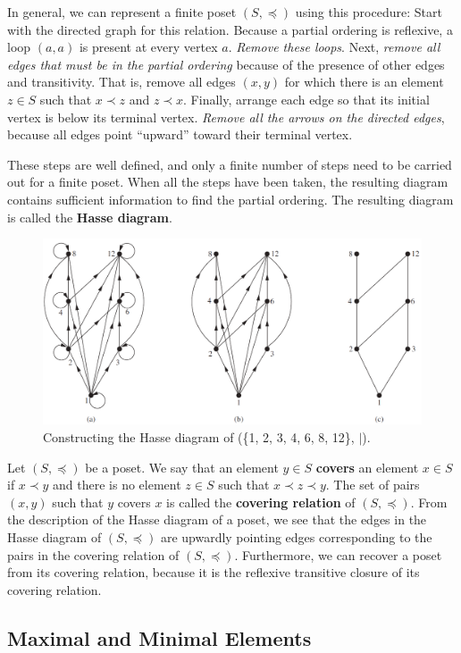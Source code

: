 \documentclass[11pt]{article}
\begin{document}
In general, we can represent a finite poset $(S, \preceq)$ using this procedure: Start with the directed graph for this relation. Because a partial ordering is reflexive, a loop $(a, a)$ is present at every vertex $a$. \textit{Remove these loops}. Next, \textit{remove all edges that must be in the partial ordering} because of the presence of other edges and transitivity. That is, remove all edges $(x, y)$ for which there is an element $z \in S$ such that $x \prec z$ and $z \prec x$. Finally, arrange each edge so that its initial vertex is below its terminal vertex. \textit{Remove all the arrows on the directed edges}, because all edges point “upward” toward their terminal vertex.

These steps are well defined, and only a finite number of steps need to be carried out for a finite poset. When all the steps have been taken, the resulting diagram contains sufficient information to find the partial ordering. The resulting diagram is called the \textbf{Hasse diagram}.

\begin{figure}[h!]
    \centering
    \includegraphics[width=.6\textwidth]{img/ch9.6-f3.png}
    \caption{Constructing the Hasse diagram of (\{1, 2, 3, 4, 6, 8, 12\}, $|$).}
    \label{fig:my_label}
\end{figure}

Let $(S, \preceq)$ be a poset. We say that an element $y \in S$ \textbf{covers} an element $x \in S$ if $x \prec y$ and there is no element $z \in S$ such that $x \prec z \prec y$. The set of pairs $(x, y)$ such that $y$ covers $x$ is called the \textbf{covering relation} of $(S, \preceq)$. From the description of the Hasse diagram of a poset, we see that the edges in the Hasse diagram of $(S, \preceq)$ are upwardly pointing edges corresponding to the pairs in the covering relation of $(S, \preceq)$. Furthermore, we can recover a poset from its covering relation, because it is the reflexive transitive closure of its covering relation.

\subsection{Maximal and Minimal Elements}
\end{document}
